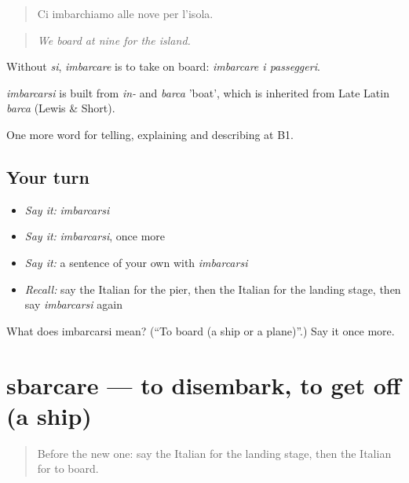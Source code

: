 \begin{quote}
Ci imbarchiamo alle nove per l'isola.
\end{quote}

\begin{quote}
\emph{We board at nine for the island.}
\end{quote}

Without \emph{si}, \emph{imbarcare} is to take on board: \emph{imbarcare i passeggeri}.

\begin{cousinweb}
\emph{imbarcarsi} is built from \emph{in-} and \emph{barca} 'boat', which is inherited from Late Latin \emph{barca} (Lewis \& Short).
\end{cousinweb}

\begin{grammarlens}[title={What you've built}]
One more word for telling, explaining and describing at B1.
\end{grammarlens}

\subsection*{Your turn}
\begin{itemize}
\raggedright
  \item \emph{Say it:} \emph{imbarcarsi}
  \item \emph{Say it:} \emph{imbarcarsi}, once more
  \item \emph{Say it:} a sentence of your own with \emph{imbarcarsi}
  \item \emph{Recall:} say the Italian for the pier, then the Italian for the landing stage, then say \emph{imbarcarsi} again
\end{itemize}

\begin{tcolorbox}[breakable,colback=teal!4,colframe=teal!35!black,title={Before you move on}]
What does imbarcarsi mean? (\textquotedblleft{}To board (a ship or a plane)\textquotedblright{}.) Say it once more.
\end{tcolorbox}
\section[sbarcare]{sbarcare — to disembark, to get off (a ship)}

\label{lesson:IT-C421-sbarcare}



\begin{quote}
Before the new one: say the Italian for the landing stage, then the Italian for to board.
\end{quote}

